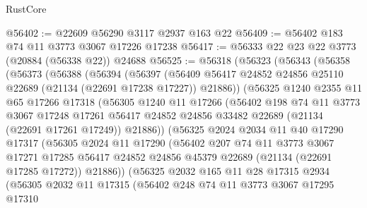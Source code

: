 \begin{lexlean}{RustCore}
\begin{coremodule}
@56402 := @22609 @56290 @3117 @2937 @163 @22
@56409 := @56402 @183 @74 @11 @3773 @3067 @17226 @17238
@56417 := @56333 @22 @23 @22 @3773 (@20884 (@56338 @22)) @24688
@56525 := @56318
    (@56323
      (@56343
        (@56358
          (@56373
            (@56388
              (@56394
                (@56397
                  (@56409
                    @56417
                    @24852
                    @24856
                    @25110
                    @22689
                    (@21134 (@22691 @17238 @17227))
                    @21886))
                (@56325
                  @1240
                  @2355
                  @11
                  @65
                  @17266
                  @17318
                  (@56305
                    @1240
                    @11
                    @17266
                    (@56402
                      @198
                      @74
                      @11
                      @3773
                      @3067
                      @17248
                      @17261
                      @56417
                      @24852
                      @24856
                      @33482
                      @22689
                      (@21134 (@22691 @17261 @17249))
                      @21886))
                  (@56325
                    @2024
                    @2034
                    @11
                    @40
                    @17290
                    @17317
                    (@56305
                      @2024
                      @11
                      @17290
                      (@56402
                        @207
                        @74
                        @11
                        @3773
                        @3067
                        @17271
                        @17285
                        @56417
                        @24852
                        @24856
                        @45379
                        @22689
                        (@21134 (@22691 @17285 @17272))
                        @21886))
                    (@56325
                      @2032
                      @165
                      @11
                      @28
                      @17315
                      @2934
                      (@56305
                        @2032
                        @11
                        @17315
                        (@56402
                          @248
                          @74
                          @11
                          @3773
                          @3067
                          @17295
                          @17310

\end{coremodule}
\end{lexlean}
